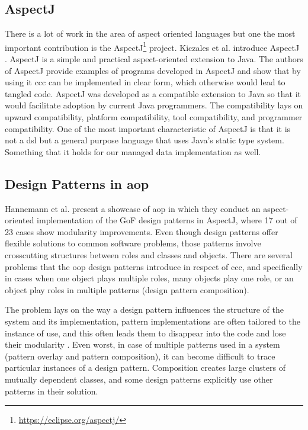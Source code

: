 \subsection{AspectJ}\label{AspectJ}
There is a lot of work in the area of aspect oriented languages but one the most important contribution is the AspectJ\footnote{\url{https://eclipse.org/aspectj/}} project.
Kiczales et al. introduce AspectJ \cite{kiczales2001overview}. AspectJ is a simple and practical aspect-oriented extension to Java. 
The authors of AspectJ provide examples of programs developed in AspectJ and show that by using it \ac{ccc} can be implemented in clear form, which otherwise would lead to tangled code. 
AspectJ was developed as a compatible extension to Java so that it would facilitate adoption by current Java programmers. 
The compatibility lays on upward compatibility, platform compatibility, tool compatibility, and programmer compatibility. One of the most important characteristic of AspectJ is that it is not a \ac{dsl} but a general purpose language that uses Java's static type system.
Something that it holds for our managed data implementation as well.

\subsection{Design Patterns in \acrlong{aop}}\label{Design Patterns in Aspect Oriented Programming}

Hannemann et al. present a showcase of \ac{aop} \cite{hannemann2002design} in which they conduct an aspect-oriented implementation of the GoF design patterns \cite{gamma1995design} in AspectJ, where 17 out of 23 cases show modularity improvements. 
Even though design patterns offer flexible solutions to common software problems, those patterns involve crosscutting structures between roles and classes and objects. 
There are several problems that the \ac{oop} design patterns introduce in respect of \ac{ccc}, and specifically in cases when one object plays multiple roles, many objects play one role, or an object play roles in multiple patterns \cite{sullivan2002advanced} (design pattern composition).

The problem lays on the way a design pattern influences the structure of the system and its implementation, pattern implementations are often tailored to the instance of use, and this often leads them to disappear into the code and lose their modularity \cite{hannemann2002design}. Even worst, in case of multiple patterns used in a system (pattern overlay and pattern composition), it can become difficult to trace particular instances of a design pattern. 
Composition creates large clusters of mutually dependent classes\cite{sullivan2002advanced}, and some design patterns explicitly use other patterns in their solution.

